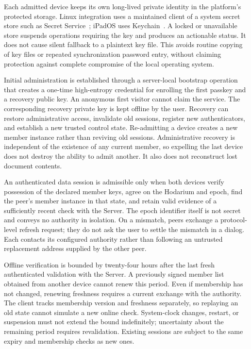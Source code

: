 \documentclass[11pt,a4paper]{article}
\theoremstyle{definition}
\theoremstyle{plain}
\begin{document}
Each admitted device keeps its own long-lived private identity in the
platform's protected storage. Linux integration uses a maintained
client of a system secret store such as Secret Service~\cite{secretservice};
iPadOS uses Keychain~\cite{keychain}. A locked or unavailable store
suspends operations requiring the key and produces an actionable
status. It does not cause silent fallback to a plaintext key file.
This avoids routine copying of key files or repeated synchronization
password entry, without claiming protection against complete compromise
of the local operating system.

Initial administration is established through a server-local bootstrap
operation that creates a one-time high-entropy credential for enrolling
the first passkey and a recovery public key. An anonymous first visitor
cannot claim the service. The corresponding recovery private key is
kept offline by the user. Recovery can restore administrative access,
invalidate old sessions, register new authenticators, and establish a
new trusted control state. Re-admitting a device creates a new member
instance rather than reviving old sessions. Administrative recovery is
independent of the existence of any current member, so expelling the
last device does not destroy the ability to admit another. It also does
not reconstruct lost document contents.

An authenticated data session is admissible only when both devices
verify possession of the declared member keys, agree on the Hodarium
and epoch, find the peer's member instance in that state, and retain
valid evidence of a sufficiently recent check with the Server. The
epoch identifier itself is not secret and conveys no authority in
isolation. On a mismatch, peers exchange a protocol-level refresh
request; they do not ask the user to settle the mismatch in a dialog.
Each contacts its configured authority rather than following an
untrusted replacement address supplied by the other peer.

Offline verification is bounded by twenty-four hours after the last
fresh authenticated validation with the Server. A previously signed
member list obtained from another device cannot renew this period.
Even if membership has not changed, renewing freshness requires a
current exchange with the authority. The client tracks membership
version and freshness separately, so replaying an old state cannot
simulate a new online check. System-clock changes, restart, or suspension
must not extend the bound indefinitely; uncertainty about the remaining
period requires revalidation. Existing sessions are subject to the same
expiry and membership checks as new ones.
\end{document}
